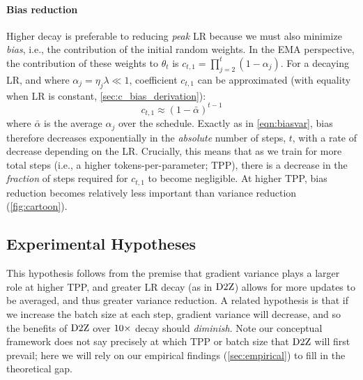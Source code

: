 \paragraph{Bias reduction}
Higher decay is preferable to reducing \emph{peak} LR because we must
also minimize \emph{bias}, i.e., the contribution of the initial
random weights.
%
In the EMA perspective, the contribution of these weights to
$\theta_t$ is $c_{t,1} = \prod_{j=2}^{t} (1 - \alpha_j)$.  For a
decaying LR, and where $\alpha_j = \eta_j\lambda \ll 1$, coefficient
$c_{t,1}$ can be approximated (with equality when LR is constant,
\cref{sec:c_bias_derivation}):
\begin{equation}\label{eq:c_bias}
c_{t,1} \approx (1-\bar{\alpha})^{t-1}
\end{equation}
where $\bar{\alpha}$ is the average $\alpha_j$ over the schedule.
Exactly as in \cref{eqn:biasvar}, bias therefore decreases
exponentially in the \emph{absolute} number of steps, $t$, with a rate
of decrease depending on the LR\@.  Crucially, this means that as we
train for more total steps (i.e., a higher tokens-per-parameter; TPP),
there is a decrease in the \emph{fraction} of steps required for
$c_{t,1}$ to become negligible.  At higher TPP, bias reduction becomes
relatively less important than variance reduction
(\cref{fig:cartoon}).

\subsection{Experimental Hypotheses}


This hypothesis follows from the premise that gradient variance plays
a larger role at higher TPP, and greater LR decay (as in $\mbox{D2Z}$)
allows for more updates to be averaged, and thus greater variance
reduction.
%
A related hypothesis is that if we increase the batch size at each
step, gradient variance will decrease, and so the benefits of $\mbox{D2Z}$
over $\mbox{10}\times$ decay should \emph{diminish}.
%
Note our conceptual framework does not say precisely at which TPP or
batch size that $\mbox{D2Z}$ will first prevail; here we will rely on our
empirical findings (\cref{sec:empirical}) to fill in the theoretical
gap.


